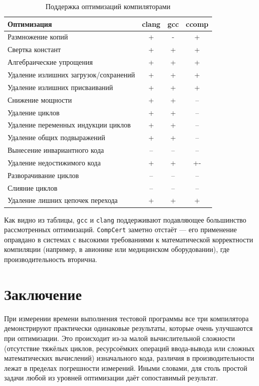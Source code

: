 \documentclass[a4paper]{article}
\begin{document}
\begin{table}[H]
\centering
\caption{Поддержка оптимизаций компиляторами}
\begin{tabular}{lccc}
\toprule
\textbf{Оптимизация} & \textbf{clang} & \textbf{gcc} & \textbf{ccomp} \\
\midrule
Размножение копий               & + & - & + \\
Свертка констант                & + & + & + \\
Алгебраические упрощения        & + & + & + \\
Удаление излишних загрузок/сохранений & + & + & + \\
Удаление излишних присваиваний  & + & + & + \\
Снижение мощности               & + & + & – \\
Удаление циклов                 & + & + & – \\
Удаление переменных индукции циклов & + & + & – \\
Удаление общих подвыражений     & + & + & – \\
Вынесение инвариантного кода    & – & – & – \\
Удаление недостижимого кода     & + & + & +- \\
Разворачивание циклов           & – & – & – \\
Слияние циклов                  & – & – & – \\
Удаление лишних цепочек перехода & + & + & + \\
\bottomrule
\end{tabular}
\end{table}

Как видно из таблицы, \texttt{gcc} и \texttt{clang} поддерживают подавляющее большинство рассмотренных оптимизаций. \texttt{CompCert} заметно отстаёт — его применение оправдано в системах с высокими требованиями к математической корректности компиляции (например, в авионике или медицинском оборудовании), где производительность вторична.

\bigskip
\section{Заключение}
При измерении времени выполнения тестовой программы все три компилятора демонстрируют практически одинаковые результаты, которые очень улучшаются при оптимизации. Это происходит из-за малой вычислительной сложности (отсутствие тяжёлых циклов, ресурсоёмких операций ввода‑вывода или сложных математических вычислений) изначального кода, различия в производительности лежат в пределах погрешности измерений. Иными словами, для столь простой задачи любой из уровней оптимизации даёт сопоставимый результат.
\end{document}
